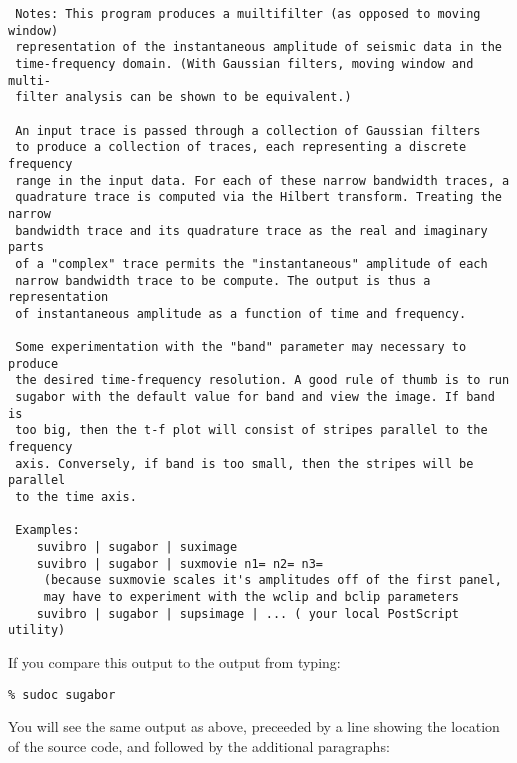 {{{\begin{verbatim}
 Notes: This program produces a muiltifilter (as opposed to moving window)
 representation of the instantaneous amplitude of seismic data in the   
 time-frequency domain. (With Gaussian filters, moving window and multi-
 filter analysis can be shown to be equivalent.)                        
                                                                        
 An input trace is passed through a collection of Gaussian filters      
 to produce a collection of traces, each representing a discrete frequency
 range in the input data. For each of these narrow bandwidth traces, a 
 quadrature trace is computed via the Hilbert transform. Treating the narrow
 bandwidth trace and its quadrature trace as the real and imaginary parts
 of a "complex" trace permits the "instantaneous" amplitude of each
 narrow bandwidth trace to be compute. The output is thus a representation
 of instantaneous amplitude as a function of time and frequency.        
                                                                        
 Some experimentation with the "band" parameter may necessary to produce
 the desired time-frequency resolution. A good rule of thumb is to run 
 sugabor with the default value for band and view the image. If band is
 too big, then the t-f plot will consist of stripes parallel to the frequency
 axis. Conversely, if band is too small, then the stripes will be parallel
 to the time axis.                                                      
                                                                        
 Examples:                                                              
    suvibro | sugabor | suximage                                        
    suvibro | sugabor | suxmovie n1= n2= n3=                            
     (because suxmovie scales it's amplitudes off of the first panel,  
     may have to experiment with the wclip and bclip parameters        
    suvibro | sugabor | supsimage | ... ( your local PostScript utility)

\end{verbatim}} \noindent

If you compare this output to the output from typing:

{\small \begin{verbatim}
% sudoc sugabor 
\end{verbatim}}\noindent

You will see the same output as above, preceeded by
a line showing the location of the source code,
and followed by the additional paragraphs: 
{\small \begin{verbatim}


\end{verbatim}}}}
